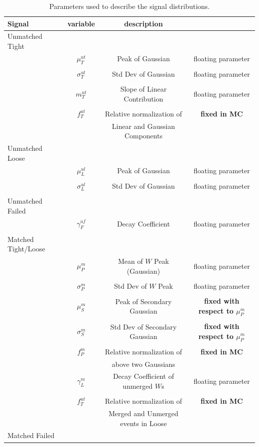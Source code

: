 \begin{table}
\centering
\begin{tabular}{l | c  c  c}
Signal & variable & description & \\
\hline\hline
Unmatched Tight & & & \\
& $\mu^{ut}_T$ & Peak of Gaussian & floating parameter\\
\\
& $\sigma^{ut}_T$ & Std Dev of Gaussian & floating parameter\\
\\
& $m^{ut}_T$ & Slope of Linear Contribution & floating parameter\\
\\
& $f^{ut}_T$ & Relative normalization of & \textbf{fixed in MC}\\
& &  Linear and Gaussian Components &\\
\hline
Unmatched Loose & & & \\
& $\mu^{ul}_L$ & Peak of Gaussian & floating parameter\\
\\
& $\sigma^{ul}_L$ & Std Dev of Gaussian & floating parameter\\
\\
\hline
Unmatched Failed & & & \\
& $\gamma^{uf}_F$ & Decay Coefficient & floating parameter\\
\\
\hline
Matched Tight/Loose & & & \\\
& $\mu^{m}_P$ & Mean of $W$ Peak (Gaussian) & floating parameter\\
\\
& $\sigma^{m}_P$ & Std Dev of $W$ Peak & floating parameter\\
\\
& $\mu^{m}_S$ & Peak of Secondary Gaussian & \textbf{fixed with respect to $\mu^{m}_P$}\\
\\
& $\sigma^{m}_S$ & Std Dev of Secondary Gaussian & \textbf{fixed with respect to $\mu^{m}_P$}\\
\\
& $f^{m}_P$ & Relative normalization of & \textbf{fixed in MC}\\
& &  above two Gaussians &\\
& $\gamma^{m}_L$ & Decay Coefficient of unmerged $W$s & floating parameter\\
\\
& $f^{ut}_T$ & Relative normalization of & \textbf{fixed in MC}\\
& &  Merged and Unmerged events in Loose &\\
\hline
Matched Failed & & & \\
\hline
\end{tabular}
\caption{Parameters used to describe the signal distributions.} \label{tab:sigval}
\end{table}
